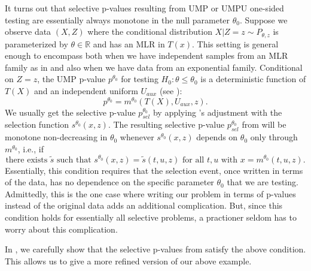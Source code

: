 \documentclass{article}
\newcommand{\R}{\mathbb{R}}
\begin{document}
\begin{appendix}
It turns out that selective p-values resulting from UMP or UMPU one-sided testing are essentially always monotone in the null parameter $\theta_0$. Suppose we observe data $(X, Z)$ where the conditional distribution $X | Z= z \sim P_{\theta, z}$ is parameterized by $\theta \in \R$ and has an MLR in $T(x)$. This setting is general enough to encompass both when we have independent samples from an MLR family as in  and also when we have data from an exponential family. Conditional on $Z = z$, the UMP p-value $p^{\theta_0}$ for testing $H_0: \theta \leq \theta_0$ is a deterministic function of $T(X)$ and an independent uniform $U_{aux}$ (see ):
\begin{equation}
    p^{\theta_0} = m^{\theta_0}(T(X), U_{aux}, z).
\end{equation}
We usually get the selective p-value $p^{\theta_0}_{sel}$ by applying 's adjustment with the selection function $s^{\theta_0}(x, z)$. The resulting selective p-value $p^{\theta_0}_{sel}$ from  will be monotone non-decreasing in $\theta_0$ whenever $s^{\theta_0}(x, z)$ depends on $\theta_0$ only through $m^{\theta_0}$, i.e., if 
\begin{equation*}
   \text{there exists } \tilde{s} \text{ such that } s^{\theta_0}(x, z) = \tilde{s}(t, u, z) \text{ for all } t, u \text{ with } x = m^{\theta_0}(t, u, z).
\end{equation*}
Essentially, this condition requires that the selection event, once written in terms of the data, has no dependence on the specific parameter $\theta_0$ that we are testing. Admittedly, this is the one case where writing our problem in terms of p-values instead of the original data adds an additional complication. But, since this condition holds for essentially all selective problems, a practioner seldom has to worry about this complication.  

In , we carefully show that the selective p-values from  satisfy the above condition. This allows us to give a more refined version of our above example. 


\end{appendix}
\end{document}
